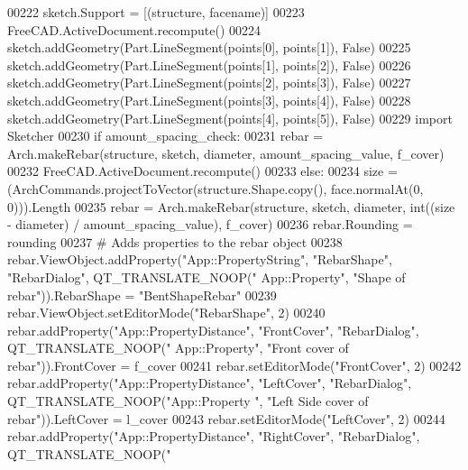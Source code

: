 \begin{DoxyCode}
00222     sketch.Support = [(structure, facename)]
00223     FreeCAD.ActiveDocument.recompute()
00224     sketch.addGeometry(Part.LineSegment(points[0], points[1]), \textcolor{keyword}{False})
00225     sketch.addGeometry(Part.LineSegment(points[1], points[2]), \textcolor{keyword}{False})
00226     sketch.addGeometry(Part.LineSegment(points[2], points[3]), \textcolor{keyword}{False})
00227     sketch.addGeometry(Part.LineSegment(points[3], points[4]), \textcolor{keyword}{False})
00228     sketch.addGeometry(Part.LineSegment(points[4], points[5]), \textcolor{keyword}{False})
00229     \textcolor{keyword}{import} Sketcher
00230     \textcolor{keywordflow}{if} amount\_spacing\_check:
00231         rebar = Arch.makeRebar(structure, sketch, diameter, amount\_spacing\_value, f\_cover)
00232         FreeCAD.ActiveDocument.recompute()
00233     \textcolor{keywordflow}{else}:
00234         size = (ArchCommands.projectToVector(structure.Shape.copy(), face.normalAt(0, 0))).Length
00235         rebar = Arch.makeRebar(structure, sketch, diameter, int((size - diameter) / amount\_spacing\_value), 
      f\_cover)
00236     rebar.Rounding = rounding
00237     \textcolor{comment}{# Adds properties to the rebar object}
00238     rebar.ViewObject.addProperty(\textcolor{stringliteral}{"App::PropertyString"}, \textcolor{stringliteral}{"RebarShape"}, \textcolor{stringliteral}{"RebarDialog"}, QT\_TRANSLATE\_NOOP(\textcolor{stringliteral}{"
      App::Property"}, \textcolor{stringliteral}{"Shape of rebar"})).RebarShape = \textcolor{stringliteral}{"BentShapeRebar"}
00239     rebar.ViewObject.setEditorMode(\textcolor{stringliteral}{"RebarShape"}, 2)
00240     rebar.addProperty(\textcolor{stringliteral}{"App::PropertyDistance"}, \textcolor{stringliteral}{"FrontCover"}, \textcolor{stringliteral}{"RebarDialog"}, QT\_TRANSLATE\_NOOP(\textcolor{stringliteral}{"
      App::Property"}, \textcolor{stringliteral}{"Front cover of rebar"})).FrontCover = f\_cover
00241     rebar.setEditorMode(\textcolor{stringliteral}{"FrontCover"}, 2)
00242     rebar.addProperty(\textcolor{stringliteral}{"App::PropertyDistance"}, \textcolor{stringliteral}{"LeftCover"}, \textcolor{stringliteral}{"RebarDialog"}, QT\_TRANSLATE\_NOOP(\textcolor{stringliteral}{"App::Property
      "}, \textcolor{stringliteral}{"Left Side cover of rebar"})).LeftCover = l\_cover
00243     rebar.setEditorMode(\textcolor{stringliteral}{"LeftCover"}, 2)
00244     rebar.addProperty(\textcolor{stringliteral}{"App::PropertyDistance"}, \textcolor{stringliteral}{"RightCover"}, \textcolor{stringliteral}{"RebarDialog"}, QT\_TRANSLATE\_NOOP(\textcolor{stringliteral}{"
}
\end{DoxyCode}
